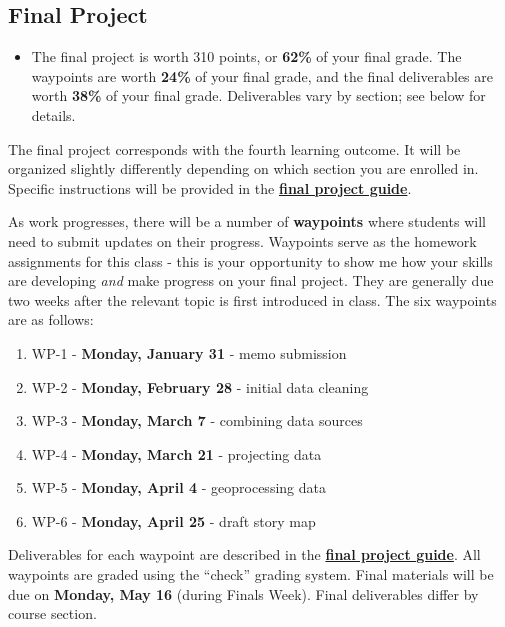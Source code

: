 \documentclass[
]{book}
\providecommand{\tightlist}{%
  \setlength{\itemsep}{0pt}\setlength{\parskip}{0pt}}
\newenvironment{rmdblock}[1]
  {\begin{shaded*}
  \begin{itemize}
  \renewcommand{\labelitemi}{
    \raisebox{-.7\height}[0pt][0pt]{
      {\setkeys{Gin}{width=3em,keepaspectratio}\texttt{[image: images/\#1]}}
    }
  }
  \item
  }
  {
  \end{itemize}
  \end{shaded*}
  }
\newenvironment{rmdtip}
  {\begin{rmdblock}{tip}}
  {\end{rmdblock}}
\begin{document}
\hypertarget{final-project}{%
\subsection{Final Project}\label{final-project}}

\begin{rmdtip}
The final project is worth 310 points, or \textbf{62\%} of your final
grade. The waypoints are worth \textbf{24\%} of your final grade, and
the final deliverables are worth \textbf{38\%} of your final grade.
Deliverables vary by section; see below for details.
\end{rmdtip}

The final project corresponds with the fourth learning outcome. It will be organized slightly differently depending on which section you are enrolled in. Specific instructions will be provided in the \href{https://slu-soc5650.github.io/final-project}{\textbf{final project guide}}.

As work progresses, there will be a number of \textbf{waypoints} where students will need to submit updates on their progress. Waypoints serve as the homework assignments for this class - this is your opportunity to show me how your skills are developing \emph{and} make progress on your final project. They are generally due two weeks after the relevant topic is first introduced in class. The six waypoints are as follows:

\begin{enumerate}
\def\labelenumi{\arabic{enumi}.}
\tightlist
\item
  WP-1 - \textbf{Monday, January 31} - memo submission
\item
  WP-2 - \textbf{Monday, February 28} - initial data cleaning
\item
  WP-3 - \textbf{Monday, March 7} - combining data sources
\item
  WP-4 - \textbf{Monday, March 21} - projecting data
\item
  WP-5 - \textbf{Monday, April 4} - geoprocessing data
\item
  WP-6 - \textbf{Monday, April 25} - draft story map
\end{enumerate}

Deliverables for each waypoint are described in the \href{https://slu-soc5650.github.io/final-project}{\textbf{final project guide}}. All waypoints are graded using the ``check'' grading system. Final materials will be due on \textbf{Monday, May 16} (during Finals Week). Final deliverables differ by course section.
\end{document}

